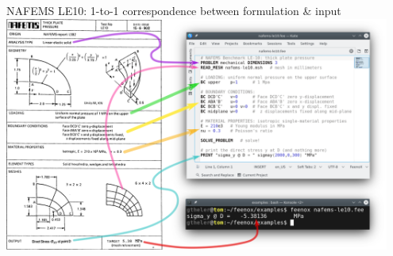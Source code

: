 \documentclass[
  ignorenonframetext,
  aspectratio=169,
]{beamer}
\begin{document}
\begin{frame}{NAFEMS LE10: 1-to-1 correspondence between formulation \&
input}
\protect\hypertarget{nafems-le10-1-to-1-correspondence-between-formulation-input}{}
\centering \includegraphics[width=0.95\textwidth,height=\textheight]{nafems-le10-problem-input.svg}
\end{frame}
\end{document}
